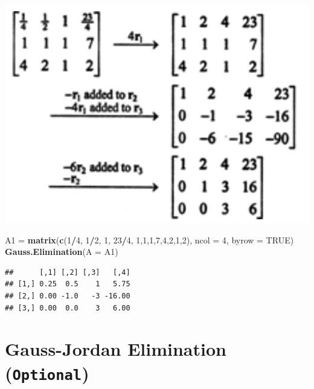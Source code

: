 \documentclass[
]{book}
\newenvironment{Shaded}{\begin{snugshade}}{\end{snugshade}}
\newcommand{\AttributeTok}[1]{\textcolor[rgb]{0.13,0.29,0.53}{#1}}
\newcommand{\ConstantTok}[1]{\textcolor[rgb]{0.56,0.35,0.01}{#1}}
\newcommand{\DecValTok}[1]{\textcolor[rgb]{0.00,0.00,0.81}{#1}}
\newcommand{\FunctionTok}[1]{\textcolor[rgb]{0.13,0.29,0.53}{\textbf{#1}}}
\newcommand{\NormalTok}[1]{#1}
\newcommand{\OtherTok}[1]{\textcolor[rgb]{0.56,0.35,0.01}{#1}}
\newcommand{\SpecialCharTok}[1]{\textcolor[rgb]{0.81,0.36,0.00}{\textbf{#1}}}
\begin{document}
\begin{center}\includegraphics[width=0.5\linewidth]{img07/w07-LabExample04-1-sol} \end{center}

\begin{Shaded}
\begin{Highlighting}[]
\NormalTok{A1 }\OtherTok{=} \FunctionTok{matrix}\NormalTok{(}\FunctionTok{c}\NormalTok{(}\DecValTok{1}\SpecialCharTok{/}\DecValTok{4}\NormalTok{, }\DecValTok{1}\SpecialCharTok{/}\DecValTok{2}\NormalTok{, }\DecValTok{1}\NormalTok{, }\DecValTok{23}\SpecialCharTok{/}\DecValTok{4}\NormalTok{, }\DecValTok{1}\NormalTok{,}\DecValTok{1}\NormalTok{,}\DecValTok{1}\NormalTok{,}\DecValTok{7}\NormalTok{,}\DecValTok{4}\NormalTok{,}\DecValTok{2}\NormalTok{,}\DecValTok{1}\NormalTok{,}\DecValTok{2}\NormalTok{), }\AttributeTok{ncol =} \DecValTok{4}\NormalTok{, }\AttributeTok{byrow =} \ConstantTok{TRUE}\NormalTok{)}
\FunctionTok{Gauss.Elimination}\NormalTok{(}\AttributeTok{A =}\NormalTok{ A1)}
\end{Highlighting}
\end{Shaded}

\begin{verbatim}
##      [,1] [,2] [,3]   [,4]
## [1,] 0.25  0.5    1   5.75
## [2,] 0.00 -1.0   -3 -16.00
## [3,] 0.00  0.0    3   6.00
\end{verbatim}

\hypertarget{gauss-jordan-elimination-optional}{%
\section{\texorpdfstring{Gauss-Jordan Elimination (\texttt{Optional})}{Gauss-Jordan Elimination (Optional)}}\label{gauss-jordan-elimination-optional}}
\end{document}
